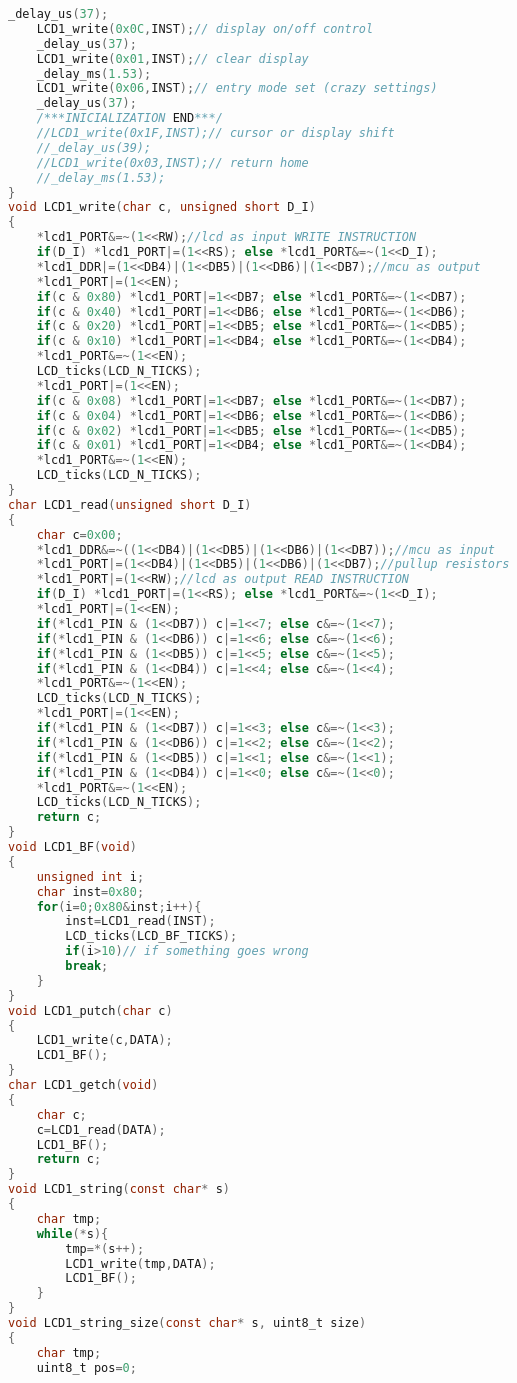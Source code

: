 \begin{lstlisting}[language=C, caption={lcd.c}, label=lcd-c, captionpos=b]
	_delay_us(37);
	LCD1_write(0x0C,INST);// display on/off control
	_delay_us(37);
	LCD1_write(0x01,INST);// clear display
	_delay_ms(1.53);
	LCD1_write(0x06,INST);// entry mode set (crazy settings)
	_delay_us(37);
	/***INICIALIZATION END***/
	//LCD1_write(0x1F,INST);// cursor or display shift
	//_delay_us(39);
	//LCD1_write(0x03,INST);// return home
	//_delay_ms(1.53);
}
void LCD1_write(char c, unsigned short D_I)
{
	*lcd1_PORT&=~(1<<RW);//lcd as input WRITE INSTRUCTION
	if(D_I) *lcd1_PORT|=(1<<RS); else *lcd1_PORT&=~(1<<D_I);
	*lcd1_DDR|=(1<<DB4)|(1<<DB5)|(1<<DB6)|(1<<DB7);//mcu as output
	*lcd1_PORT|=(1<<EN);
	if(c & 0x80) *lcd1_PORT|=1<<DB7; else *lcd1_PORT&=~(1<<DB7);
	if(c & 0x40) *lcd1_PORT|=1<<DB6; else *lcd1_PORT&=~(1<<DB6);
	if(c & 0x20) *lcd1_PORT|=1<<DB5; else *lcd1_PORT&=~(1<<DB5);
	if(c & 0x10) *lcd1_PORT|=1<<DB4; else *lcd1_PORT&=~(1<<DB4);
	*lcd1_PORT&=~(1<<EN);
	LCD_ticks(LCD_N_TICKS);
	*lcd1_PORT|=(1<<EN);
	if(c & 0x08) *lcd1_PORT|=1<<DB7; else *lcd1_PORT&=~(1<<DB7);
	if(c & 0x04) *lcd1_PORT|=1<<DB6; else *lcd1_PORT&=~(1<<DB6);
	if(c & 0x02) *lcd1_PORT|=1<<DB5; else *lcd1_PORT&=~(1<<DB5);
	if(c & 0x01) *lcd1_PORT|=1<<DB4; else *lcd1_PORT&=~(1<<DB4);
	*lcd1_PORT&=~(1<<EN);
	LCD_ticks(LCD_N_TICKS);
}
char LCD1_read(unsigned short D_I)
{
	char c=0x00;
	*lcd1_DDR&=~((1<<DB4)|(1<<DB5)|(1<<DB6)|(1<<DB7));//mcu as input
	*lcd1_PORT|=(1<<DB4)|(1<<DB5)|(1<<DB6)|(1<<DB7);//pullup resistors
	*lcd1_PORT|=(1<<RW);//lcd as output READ INSTRUCTION
	if(D_I) *lcd1_PORT|=(1<<RS); else *lcd1_PORT&=~(1<<D_I);
	*lcd1_PORT|=(1<<EN);
	if(*lcd1_PIN & (1<<DB7)) c|=1<<7; else c&=~(1<<7);
	if(*lcd1_PIN & (1<<DB6)) c|=1<<6; else c&=~(1<<6);
	if(*lcd1_PIN & (1<<DB5)) c|=1<<5; else c&=~(1<<5);
	if(*lcd1_PIN & (1<<DB4)) c|=1<<4; else c&=~(1<<4);
	*lcd1_PORT&=~(1<<EN);
	LCD_ticks(LCD_N_TICKS);
	*lcd1_PORT|=(1<<EN);
	if(*lcd1_PIN & (1<<DB7)) c|=1<<3; else c&=~(1<<3);
	if(*lcd1_PIN & (1<<DB6)) c|=1<<2; else c&=~(1<<2);
	if(*lcd1_PIN & (1<<DB5)) c|=1<<1; else c&=~(1<<1);
	if(*lcd1_PIN & (1<<DB4)) c|=1<<0; else c&=~(1<<0);
	*lcd1_PORT&=~(1<<EN);
	LCD_ticks(LCD_N_TICKS);
	return c;
}
void LCD1_BF(void)
{
	unsigned int i;
	char inst=0x80;
	for(i=0;0x80&inst;i++){
		inst=LCD1_read(INST);
		LCD_ticks(LCD_BF_TICKS);
		if(i>10)// if something goes wrong
		break;
	}
}
void LCD1_putch(char c)
{
	LCD1_write(c,DATA);
	LCD1_BF();
}
char LCD1_getch(void)
{
	char c;
	c=LCD1_read(DATA);
	LCD1_BF();
	return c;
}
void LCD1_string(const char* s)
{
	char tmp;
	while(*s){
		tmp=*(s++);
		LCD1_write(tmp,DATA);
		LCD1_BF();
	}
}
void LCD1_string_size(const char* s, uint8_t size)
{
	char tmp;
	uint8_t pos=0;

\end{lstlisting}
